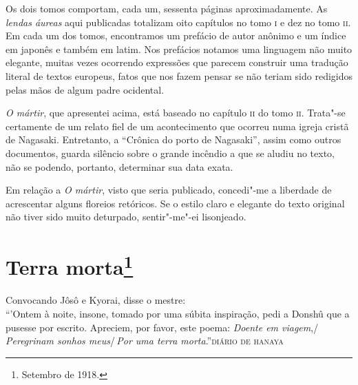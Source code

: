 Os dois tomos comportam, cada um, sessenta páginas aproximadamente. As
\textit{lendas
áureas} aqui publicadas totalizam oito capítulos no tomo \textsc{i} e
dez no tomo \textsc{ii}. Em cada um dos tomos, encontramos um prefácio de autor
anônimo e um índice em japonês e também em latim. Nos prefácios notamos
uma linguagem não muito elegante, muitas vezes ocorrendo expressões que
parecem construir uma tradução literal de textos europeus, fatos que
nos fazem pensar se não teriam sido redigidos pelas mãos de algum padre
ocidental.

\textit{O mártir}, que apresentei acima, está baseado no capítulo \textsc{ii} do tomo
\textsc{ii}. Trata"-se certamente de um relato fiel de um acontecimento que
ocorreu numa igreja cristã de Nagasaki. Entretanto, a ``Crônica do porto
de Nagasaki'', assim como outros documentos, guarda silêncio sobre o
grande incêndio a que se aludiu no texto, não se podendo, portanto,
determinar sua data exata.

Em relação a \textit{O mártir}, visto que seria publicado, concedi"-me a
liberdade de acrescentar alguns floreios retóricos. Se o estilo claro e
elegante do texto original não tiver sido muito deturpado, sentir"-me"-ei
lisonjeado.


\chapter{Terra morta\footnote{Setembro de 1918.}}

\setlength{\epigraphwidth}{.60\textwidth}
\begin{epigraphs} 
\qitem
{Convocando Jôsô e Kyorai, disse o mestre:\\
``'Ontem à noite, insone, tomado por uma súbita inspiração, pedi a Donshû que a pusesse por escrito. Apreciem, por favor, este poema: \textit{Doente em viagem},/\,\textit{Peregrinam sonhos meus}/\,\textit{Por uma terra morta}.''}{\textsc{diário de hanaya}\footnotemark}
\end{epigraphs}


